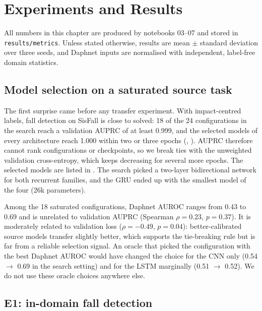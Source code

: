 \chapter{Experiments and Results}
\label{ch:results}

All numbers in this chapter are produced by notebooks 03--07 and stored in
\texttt{results/metrics}. Unless stated otherwise, results are mean $\pm$ standard deviation over three
seeds, and Daphnet inputs are normalised with independent, label-free domain statistics.

\section{Model selection on a saturated source task}
\label{sec:selection}

The first surprise came before any transfer experiment. With impact-centred labels, fall detection
on SisFall is close to solved: 18 of the 24 configurations in the search reach a validation AUPRC of
at least 0.999, and the selected models of every architecture reach 1.000 within two or three epochs (,
). AUPRC therefore cannot rank configurations or checkpoints, so we break ties with
the unweighted validation cross-entropy, which keeps decreasing for several more epochs. The selected
models are listed in . The search picked a two-layer bidirectional network for both
recurrent families, and the GRU ended up with the smallest model of the four (26k parameters).



Among the 18 saturated configurations, Daphnet AUROC ranges from 0.43 to 0.69 and is unrelated to
validation AUPRC (Spearman $\rho=0.23$, $p=0.37$). It is moderately related to validation loss
($\rho=-0.49$, $p=0.04$): better-calibrated source models transfer slightly better, which supports the
tie-breaking rule but is far from a reliable selection signal. An oracle that picked the
configuration with the best Daphnet AUROC would have changed the choice for the CNN only (0.54 $\to$
0.69 in the search setting) and for the LSTM marginally (0.51 $\to$ 0.52). We do not use these oracle
choices anywhere else.

\section{E1: in-domain fall detection}
\label{sec:e1}

